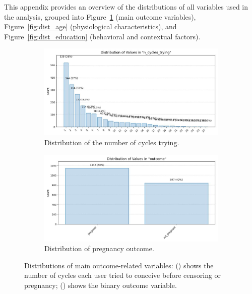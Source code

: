 \documentclass[11pt]{article}
\begin{document}
This appendix provides an overview of the distributions of all variables used in the analysis, grouped into Figure~\ref{fig:dist_n_cycles} (main outcome variables), Figure~\ref{fig:dist_age} (physiological characteristics), and Figure~\ref{fig:dist_education} (behavioral and contextual factors).



\begin{figure}[h]
  \centering
  \begin{subfigure}{0.45\textwidth}
    \includegraphics[width=\linewidth]{plots/n_cycles_trying.jpg}
    \caption{Distribution of the number of cycles trying.}
    \label{fig:dist_n_cycles}
  \end{subfigure}
  \hfill
  \begin{subfigure}{0.45\textwidth}
    \includegraphics[width=\linewidth]{plots/outcome.jpg}
    \caption{Distribution of pregnancy outcome.}
    \label{fig:dist_outcome}
  \end{subfigure}
  \caption{
    Distributions of main outcome-related variables:
    () shows the number of cycles each user tried to conceive before censoring or pregnancy; 
    () shows the binary outcome variable.
  }
\end{figure}
\end{document}
